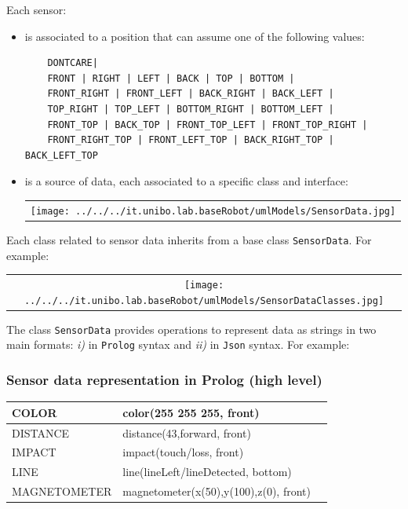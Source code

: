 Each sensor:
\begin{itemize}
\item is associated to a position that can assume one of the following values:
\begin{verbatim}
	DONTCARE| 
	FRONT | RIGHT | LEFT | BACK | TOP | BOTTOM |
	FRONT_RIGHT | FRONT_LEFT | BACK_RIGHT | BACK_LEFT | 
	TOP_RIGHT | TOP_LEFT | BOTTOM_RIGHT | BOTTOM_LEFT |
	FRONT_TOP | BACK_TOP | FRONT_TOP_LEFT | FRONT_TOP_RIGHT |
	FRONT_RIGHT_TOP | FRONT_LEFT_TOP | BACK_RIGHT_TOP | BACK_LEFT_TOP 
\end{verbatim}
\item is a source of data, each associated to a specific class and interface:     
\begin{center}
\begin{tabular}{ c }
     \texttt{[image: ../../../it.unibo.lab.baseRobot/umlModels/SensorData.jpg]}\\
\end{tabular} 
\end{center}
\end{itemize}

Each class related to sensor data inherits from a base class \texttt{SensorData}. For example:

\begin{center}
\begin{tabular}{ c }
     \texttt{[image: ../../../it.unibo.lab.baseRobot/umlModels/SensorDataClasses.jpg]}\\
\end{tabular} 
\end{center}


The class \texttt{SensorData} provides operations to represent data as strings in two main formats: \textit{i)} in \texttt{Prolog} syntax and \textit{ii)} in \texttt{Json} syntax. For example:

\subsubsection{Sensor data representation in Prolog (high level)}
\begin{flushleft}
\begin{tabular}{|l|l|l|}
\hline 
COLOR & color(255 255 255, front)  \\ 
\hline 
DISTANCE & distance(43,forward, front)   \\ 
\hline 
IMPACT  & impact(touch/loss, front)   \\ 
\hline 
LINE & line(lineLeft/lineDetected, bottom)   \\ 
\hline 
MAGNETOMETER & magnetometer(x(50),y(100),z(0), front)   \\ 
\hline 
\end{tabular} 
\end{flushleft}

